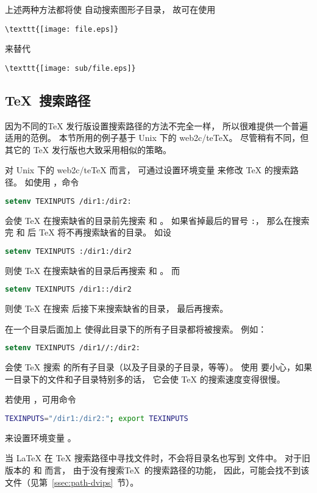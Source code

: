 上述两种方法都将使  自动搜索图形子目录，
故可在使用
\begin{lstlisting}
\texttt{[image: file.eps]}
\end{lstlisting}
来替代
\begin{lstlisting}
\texttt{[image: sub/file.eps]}
\end{lstlisting}

\subsection{\TeX{}~搜索路径}\label{ssec:texpath}

因为不同的\TeX{} 发行版设置搜索路径的方法不完全一样，
所以很难提供一个普遍适用的范例。
本节所用的例子基于 Unix 下的 web2c/te\TeX{}。
尽管稍有不同，但其它的 \TeX{} 发行版也大致采用相似的策略。

对 Unix 下的 web2c/te\TeX{} 而言，
可通过设置环境变量  来修改 \TeX{} 的搜索路径。
如使用 ，命令
\begin{lstlisting}[language=csh]
setenv TEXINPUTS /dir1:/dir2:
\end{lstlisting}
会使 \TeX{} 在搜索缺省的目录前先搜索  和 。
如果省掉最后的冒号 \texttt{:}，
那么在搜索完  和  后 \TeX{} 将不再搜索缺省的目录。
如设
\begin{lstlisting}[language=csh]
setenv TEXINPUTS :/dir1:/dir2
\end{lstlisting}
则使 \TeX{} 在搜索缺省的目录后再搜索  和 。
而
\begin{lstlisting}[language=csh]
setenv TEXINPUTS /dir1::/dir2
\end{lstlisting}
则使 \TeX{} 在搜索  后接下来搜索缺省的目录，
最后再搜索。

在一个目录后面加上 \file{//} 使得此目录下的所有子目录都将被搜索。
例如：
\begin{lstlisting}[language=csh]
setenv TEXINPUTS /dir1//:/dir2:
\end{lstlisting}
会使 \TeX{} 搜索  的所有子目录（以及子目录的子目录，等等）。
使用 \file{//} 要小心，如果一目录下的文件和子目录特别多的话，
它会使 \TeX{} 的搜索速度变得很慢。

若使用 ，可用命令
\begin{lstlisting}[language=sh]
TEXINPUTS="/dir1:/dir2:"; export TEXINPUTS
\end{lstlisting}
来设置环境变量 。

当 \LaTeX{} 在 \TeX{} 搜索路径中寻找文件时，不会将目录名也写到  文件中。
对于旧版本的  和  而言，
由于没有搜索\TeX{}~的搜索路径的功能，
因此，可能会找不到该文件（见第~\ref{ssec:path-dvips}~节）。


